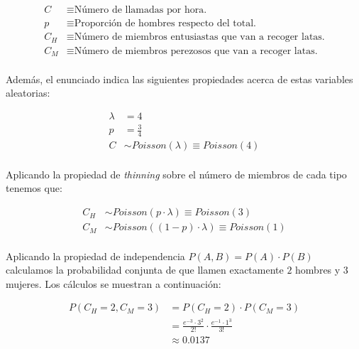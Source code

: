 \documentclass[a4paper, spanish]{article}
\begin{document}
    \begin{align*}
      C &\equiv \text{Número de llamadas por hora.} \\
      p &\equiv \text{Proporción de hombres respecto del total.} \\
      C_H &\equiv \text{Número de miembros entusiastas que van a recoger latas.} \\
      C_M &\equiv \text{Número de miembros perezosos que van a recoger latas.}
    \end{align*}

    \paragraph{}
    Además, el enunciado indica las siguientes propiedades acerca de estas variables aleatorias:

    \begin{align*}
      \lambda &= 4 \\
      p &= \frac{3}{4} \\
      C &\sim Poisson(\lambda) \equiv Poisson(4)
    \end{align*}

    \paragraph{}
    Aplicando la propiedad de \emph{thinning} sobre el número de miembros de cada tipo tenemos que:

    \begin{align*}
      C_H &\sim Poisson(p \cdot \lambda) \equiv Poisson(3) \\
      C_M &\sim Poisson((1 - p) \cdot \lambda) \equiv Poisson(1)
    \end{align*}

    \paragraph{}
    Aplicando la propiedad de independencia $P(A, B) = P(A) \cdot P(B)$ calculamos la probabilidad conjunta de que llamen exactamente $2$ hombres y $3$ mujeres. Los cálculos se muestran a continuación:

    \begin{align*}
      P(C_H = 2, C_M = 3)
      &= P(C_H = 2) \cdot P(C_M = 3) \\
      &= \frac{e^{-3} \cdot 3^2}{2!} \cdot \frac{e^{-1} \cdot 1^3}{3!} \\
      &\approx 0.0137
    \end{align*}
\end{document}
